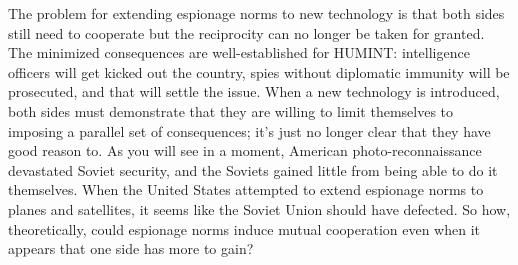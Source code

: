 \documentclass{memoir}
\begin{document}
\begin{refsegment}
The problem for extending espionage norms to new technology is that both sides still need to cooperate but the reciprocity can no longer be taken for granted. The minimized consequences are well-established for HUMINT: intelligence officers will get kicked out the country, spies without diplomatic immunity will be prosecuted, and that will settle the issue. When a new technology is introduced, both sides must demonstrate that they are willing to limit themselves to imposing a parallel set of consequences; it's just no longer clear that they have good reason to. As you will see in a moment, American photo-reconnaissance devastated Soviet security, and the Soviets gained little from being able to do it themselves. When the United States attempted to extend espionage norms to planes and satellites, it seems like the Soviet Union should have defected. So how, theoretically, could espionage norms induce mutual cooperation even when it appears that one side has more to gain?



\end{refsegment}
\end{document}
